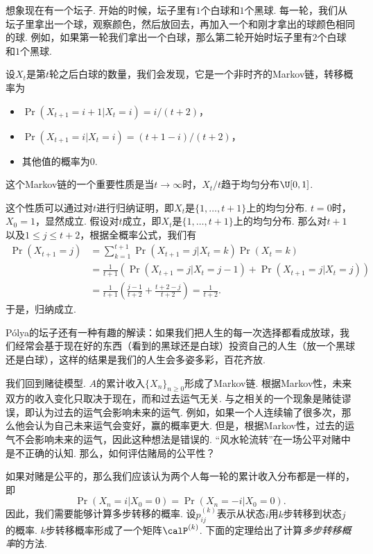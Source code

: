 \begin{example}[Pólya的坛子]
想象现在有一个坛子. 开始的时候，坛子里有$1$个白球和$1$个黑球. 每一轮，我们从坛子里拿出一个球，观察颜色，然后放回去，再加入一个和刚才拿出的球颜色相同的球. 例如，如果第一轮我们拿出一个白球，那么第二轮开始时坛子里有$2$个白球和$1$个黑球. 

设$X_t$是第$t$轮之后白球的数量，我们会发现，它是一个非时齐的Markov链，转移概率为
\begin{itemize}
    \item $\Pr(X_{t+1}=i+1|X_t=i)=i/(t+2)$，
    \item $\Pr(X_{t+1}=i|X_t=i)=(t+1-i)/(t+2)$，
    \item 其他值的概率为$0$. 
\end{itemize}
这个Markov链的一个重要性质是当$t\to\infty$时，$X_t/t$趋于均匀分布$\U[0,1]$. 

这个性质可以通过对$t$进行归纳证明，即$X_t$是$\{1,\dots,t+1\}$上的均匀分布. $t=0$时，$X_0=1$，显然成立. 假设对$t$成立，即$X_t$是$\{1,\dots,t+1\}$上的均匀分布. 那么对$t+1$以及$1\leq j\leq t+2$，根据全概率公式，我们有
\begin{align*}
    \Pr(X_{t+1}=j)&=\sum_{k=1}^{t+1}\Pr(X_{t+1}=j|X_t=k)\Pr(X_t=k)\\
    &=\frac{1}{t+1}(\Pr(X_{t+1}=j|X_t=j-1)+\Pr(X_{t+1}=j|X_t=j))\\
    &=\frac{1}{t+1}\left(\frac{j-1}{t+2}+\frac{t+2-j}{t+2}\right)=\frac{1}{t+2}.
\end{align*}
于是，归纳成立.

Pólya的坛子还有一种有趣的解读：如果我们把人生的每一次选择都看成放球，我们经常会基于现在好的东西（看到的黑球还是白球）投资自己的人生（放一个黑球还是白球），这样的结果是我们的人生会多姿多彩，百花齐放. 
\end{example}

我们回到赌徒模型. $A$的累计收入$\{X_n\}_{n\geq 0}$形成了Markov链. 根据Markov性，未来双方的收入变化只取决于现在，而和过去运气无关. 与之相关的一个现象是赌徒谬误，即认为过去的运气会影响未来的运气. 例如，如果一个人连续输了很多次，那么他会认为自己未来运气会变好，赢的概率更大. 但是，根据Markov性，过去的运气不会影响未来的运气，因此这种想法是错误的. ``风水轮流转''在一场公平对赌中是不正确的认知. 那么，如何评估赌局的公平性？

如果对赌是公平的，那么我们应该认为两个人每一轮的累计收入分布都是一样的，即
    \[\Pr(X_n=i|X_0=0)=\Pr(X_n=-i|X_0=0).\]
因此，我们需要能够计算多步转移的概率. 设$p_{ij}^{(k)}$表示从状态$i$用$k$步转移到状态$j$的概率. $k$步转移概率形成了一个矩阵$\calP^{(k)}$. 下面的定理给出了计算\emph{多步转移概率}的方法.

